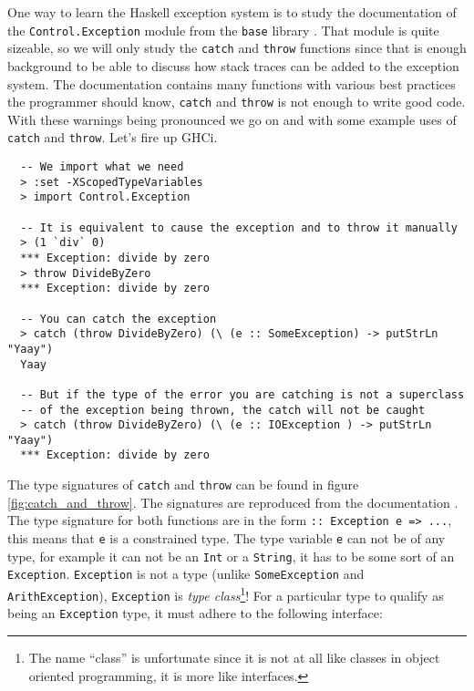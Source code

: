One way to learn the Haskell exception system is to study the
documentation of the \texttt{Control.Exception} module from the
\texttt{base} library \cite{hackage_base_control_exception}.
That module is quite sizeable, so
we will only study the \texttt{catch} and \texttt{throw} functions since
that is enough background to be able to discuss how stack traces can be added
to the exception system. The documentation contains many functions with various best practices
the programmer should know, \texttt{catch} and
\texttt{throw} is not enough to write good code. With
these warnings being pronounced we go on and with some example
uses of \texttt{catch} and \texttt{throw}. Let's fire up GHCi.

\begin{verbatim}
  -- We import what we need
  > :set -XScopedTypeVariables
  > import Control.Exception

  -- It is equivalent to cause the exception and to throw it manually
  > (1 `div` 0)
  *** Exception: divide by zero
  > throw DivideByZero
  *** Exception: divide by zero

  -- You can catch the exception
  > catch (throw DivideByZero) (\ (e :: SomeException) -> putStrLn "Yaay")
  Yaay

  -- But if the type of the error you are catching is not a superclass
  -- of the exception being thrown, the catch will not be caught
  > catch (throw DivideByZero) (\ (e :: IOException ) -> putStrLn "Yaay")
  *** Exception: divide by zero
\end{verbatim}

The type signatures of \texttt{catch} and \texttt{throw} can be found in
figure \ref{fig:catch_and_throw}. The signatures are reproduced from the
documentation \cite{hackage_base_control_exception}. The type signature
for both functions are in the form \texttt{:: Exception e => ...}, this
means that \texttt{e} is a constrained type. The type variable
\texttt{e} can not be of any type, for example it can not be an \texttt{Int} or a
\texttt{String}, it has to be some sort of an \texttt{Exception}.
\texttt{Exception} is not a type (unlike \texttt{SomeException} and
\texttt{ArithException}), \texttt{Exception} is
\emph{type class}\footnote{The name ``class'' is unfortunate since
it is not at all like classes in object oriented programming, it is
more like interfaces.}! For a particular type to qualify as being an
\texttt{Exception} type, it must adhere to the following interface:

